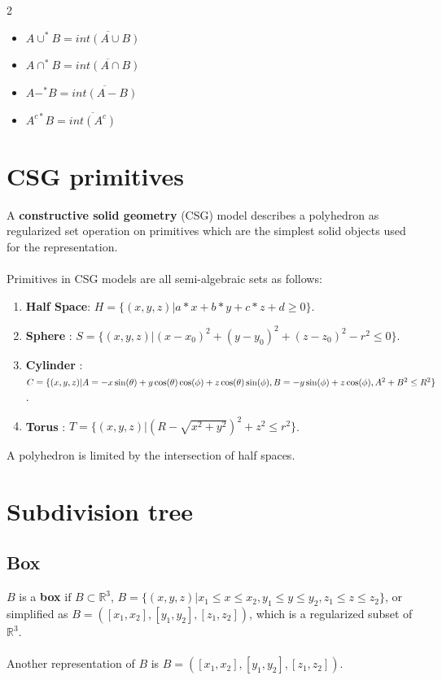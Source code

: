 \documentclass[twoside]{article}
\begin{document}
\begin{multicols}{2}
\begin{itemize}
  \item $A \cup^* B = \overline{int (A \cup B)}$
  \item $A \cap^* B = \overline{int (A \cap B)}$
  \item $A -^* B = \overline{int (A - B)}$
  \item $A^{c*} B = \overline{int (A^c)}$
 \end{itemize}


\section{CSG primitives}

A \textbf{constructive solid geometry} (CSG) model describes a polyhedron as regularized set operation on primitives which are the simplest solid objects used for the representation.
      \\
      \\
      \indent
Primitives in CSG models are all semi-algebraic sets as follows:
\begin{enumerate}
      \item \textbf{Half Space}: $H=\{(x,y,z)|a*x+b*y+c*z+d\ge0\}$.
      \item \textbf{Sphere} : $S=\{(x,y,z)|(x-x_0)^2+(y-y_0)^2+(z-z_0)^2-r^2\le0\}$. 
      \item \textbf{Cylinder} : $C=\{(x,y,z)|A=-x\sin(\theta)+y\cos(\theta)\cos(\phi)+z\cos(\theta)\sin(\phi), \\
B=-y\sin(\phi)+ z\cos(\phi),A^2+B^2\le R^2\}$.
      \item \textbf{Torus} : $T=\{(x,y,z)|(R-\sqrt{x^2+y^2})^2+z^2\le r^2\}$. 

      
\end{enumerate}
A polyhedron is limited by the intersection of half spaces.



\section {Subdivision tree}

\subsection {Box}
            	$B$ is a \textbf{box} $\mathrm{if}$ $B \subset \mathbb{R}^3$, $B=\{ (x,y,z)|x_1\le x\le x_2, y_1\le y\le y_2, z_1\le z\le z_2\}$, or simplified as $B=([x_1,x_2],[y_1,y_2],[z_1,z_2])$, which is a regularized subset of $\mathbb{R}^3$.
            	\iffalse
        \\
		\\
		\indent Another representation of $B$ is $B=([x_1,x_2],[y_1,y_2],[z_1,z_2])$.
		\\
        \\
        

\end{multicols}
\end{document}
